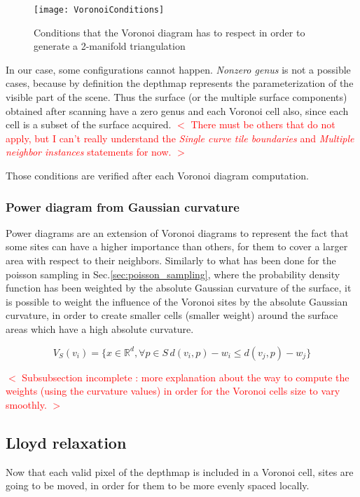 \documentclass[11pt,fleqn]{book} %
\newcommand{\arnaud}[1]{\textcolor{red}{$<$ #1 $>$}}
\begin{document}
\begin{figure}[ht]
\centering\texttt{[image: VoronoiConditions]}
\caption{Conditions that the Voronoi diagram has to respect in order to generate a 2-manifold triangulation \cite{Gus07}}
\label{fig:voronoi_conditions}
\end{figure}

In our case, some configurations cannot happen.
\textit{Nonzero genus} is not a possible cases, because by definition the depthmap represents the parameterization of the visible part of the scene. Thus the surface (or the multiple surface components) obtained after scanning have a zero genus and each Voronoi cell also, since each cell is a subset of the surface acquired.
\arnaud{There must be others that do not apply, but I can't really understand the \textit{Single curve tile boundaries} and \textit{Multiple neighbor instances} statements for now.}

Those conditions are verified after each Voronoi diagram computation. 

\subsubsection{Power diagram from Gaussian curvature}
Power diagrams are an extension of Voronoi diagrams to represent the fact that some sites can have a higher importance than others, for them to cover a larger area with respect to their neighbors. Similarly to what has been done for the poisson sampling in Sec.\ref{sec:poisson_sampling}, where the probability density function has been weighted by the absolute Gaussian curvature of the surface, it is possible to weight the influence of the Voronoi sites by the absolute Gaussian curvature, in order to create smaller cells (smaller weight) around the surface areas which have a high absolute curvature.

\begin{equation}
\label{eq:power_cell}
	V_S(v_i) = \{ x \in \mathbb{R}^d, \forall p \in S\, d(v_i,p) - w_i \leq d(v_j,p) - w_j\}
\end{equation}

\arnaud{Subsubsection incomplete : more explanation about the way to compute the weights (using the curvature values) in order for the Voronoi cells size to vary smoothly.}

\subsection{Lloyd relaxation}
Now that each valid pixel of the depthmap is included in a Voronoi cell, sites are going to be moved, in order for them to be more evenly spaced locally.
\end{document}
